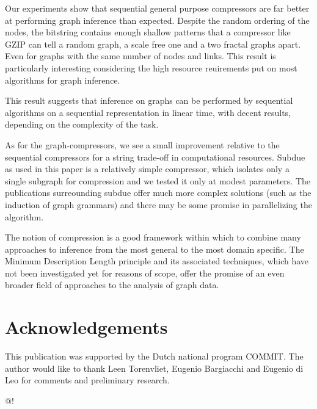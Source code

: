 \documentclass[10pt,a4paper,oneside]{article}
\begin{document}
Our experiments show that sequential general purpose compressors are far better at performing graph inference than expected. Despite the random ordering of the nodes, the bitstring contains enough shallow patterns that a compressor like GZIP can tell a random graph, a scale free one and a two fractal graphs apart. Even for graphs with the same number of nodes and links. This result is particularly interesting considering the high resource reuirements put on most algorithms for graph inference. 

This result suggests that inference on graphs can be performed by sequential algorithms on a sequential representation in linear time, with decent results, depending on the complexity of the task. 

As for the graph-compressors, we see a small improvement relative to the sequential compressors for a string trade-off in computational resources. Subdue as used in this paper is a relatively simple compressor, which isolates only a single subgraph for compression and we tested it only at modest parameters. The publications surreounding subdue offer much more complex solutions (such as the induction of graph grammars) and there may be some promise in parallelizing the algorithm.

The notion of compression is a good framework within which to combine many approaches to inference from the most general to the most domain specific. The Minimum Description Length principle and its associated techniques, which have not been investigated yet for reasons of scope, offer the promise of an even broader field of approaches to the analysis of graph data.
  
\section*{Acknowledgements}

This publication was supported by the Dutch national program COMMIT. The author would like to thank Leen Torenvliet, Eugenio Bargiacchi and Eugenio di Leo for comments and preliminary research.

 @!

\end{document}
